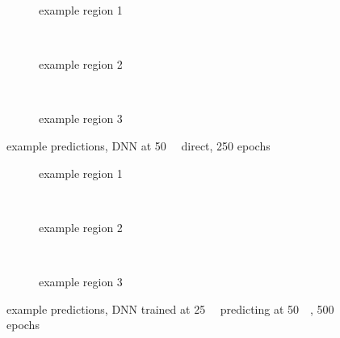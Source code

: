 \begin{figure}[p] %
    \begin{subfigure}{\textwidth}
        \centering
        \caption{example  region 1} \label{fig:results:50k_r1}
    \end{subfigure}\\[3mm]
    \begin{subfigure}{\textwidth}
        \centering
        \caption{example region 2} \label{fig:results:50k_r2}
    \end{subfigure}\\[3mm]
    \begin{subfigure}{\textwidth}
        \centering
        \caption{example region 3} \label{fig:results:50k_r3}
    \end{subfigure}
    \caption{example predictions,  DNN at \SI{50}{\kilo\bp} direct, 250 epochs} \label{fig:results:50k_matrices}
\end{figure}
\begin{figure}[p] %
    \begin{subfigure}{\textwidth}
        \centering
        \caption{example  region 1} \label{fig:results:50k_from25k_r1}
    \end{subfigure}\\[3mm]
    \begin{subfigure}{\textwidth}
        \centering
        \caption{example region 2} \label{fig:results:50k_from25k_r2}
    \end{subfigure}\\[3mm]
    \begin{subfigure}{\textwidth}
        \centering
        \caption{example region 3} \label{fig:results:50k_from25k_r3}
    \end{subfigure}
    \caption{example predictions,  DNN trained at \SI{25}{\kilo\bp} predicting at \SI{50}{\kilo\bp}, 500 epochs} \label{fig:results:50k_from25k_matrices}
\end{figure}

